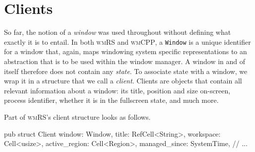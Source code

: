 \section{Clients}

So far, the notion of a \textit{window} was used throughout without defining
what exactly it is to entail. In both \textsc{wmRS} and \textsc{wmCPP}, a
\texttt{Window} is a unique identifier for a window that, again, maps windowing
system specific representations to an abstraction that is to be used within
the window manager. A window in and of itself therefore does not contain any
\textit{state}. To associate state with a window, we wrap it in a structure
that we call a \textit{client}. Clients are objects that contain all relevant
information about a window: its title, position and size on-screen, process
identifier, whether it is in the fullscreen state, and much more.


Part of \textsc{wmRS}'s client structure looks as follows.

\begin{rustblock}
  pub struct Client {
    window: Window,
    title: RefCell<String>,
    workspace: Cell<usize>,
    active_region: Cell<Region>,
    managed_since: SystemTime,
    // ...
  }
\end{rustblock}

